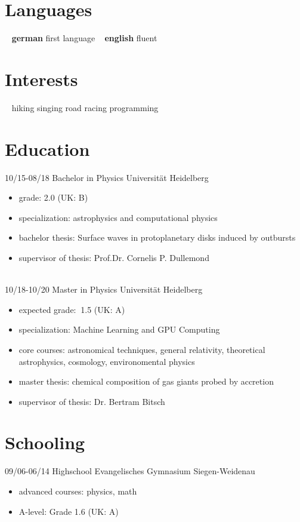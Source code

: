\documentclass[]{friggeri-cv}
\begin{document}
\begin{aside}
     \section{Languages}
	  ~
    \textbf{german}
    first language
    ~
    \textbf{english}
    fluent
 \section{Interests}
~
 hiking
 singing
  road racing
   programming
\end{aside}

\section{Education}
\begin{entrylist}
  \entry
    {10/15-08/18}
    {Bachelor in Physics}
    {Universität Heidelberg}
    {\begin{itemize}\vspace{-3mm}
    	\item grade: 2.0 (UK: B)
    	\item specialization: astrophysics and computational physics
    	\item bachelor thesis: Surface waves in protoplanetary disks induced by outbursts
    	\item supervisor of thesis: Prof.Dr. Cornelis P. Dullemond
    \end{itemize}
	}
	\\
  \entry
    {10/18-10/20}
    {Master in Physics}
    {Universität Heidelberg}
    {\begin{itemize}\vspace{-3mm}
    	\item expected grade: $~$1.5 (UK: A)
    	\item specialization: Machine Learning and GPU Computing
    	\item core courses: astronomical techniques, general relativity, theoretical astrophysics, cosmology, environomental physics
    	\item master thesis: chemical composition of gas giants probed by accretion
    	\item supervisor of thesis: Dr. Bertram Bitsch
    \end{itemize}
	}
\end{entrylist}
\section{Schooling}
\begin{entrylist}
  \entry
    {09/06-06/14}
    {Highschool}
    {Evangelisches Gymnasium Siegen-Weidenau}
    {\begin{itemize}\vspace{-3mm}
		\item advanced courses: physics, math
		\item A-level: Grade 1.6 (UK: A)
	\end{itemize}}
\end{entrylist}
\end{document}
